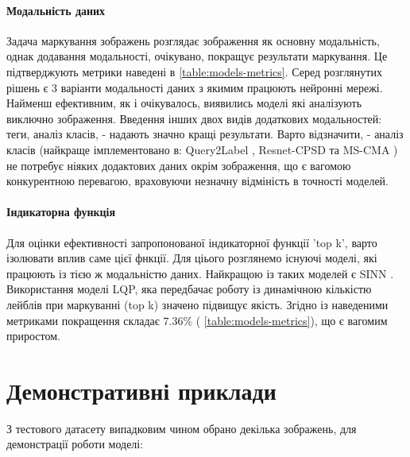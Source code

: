 \documentclass{udstu}
\begin{document}
\paragraph{\textbf{Модальність даних}}
Задача маркування зображень розглядає зображення як основну модальність, однак додавання модальності,
очікувано, покращує результати маркування. Це підтверджують метрики наведені в \tablename{ \ref{table:models-metrics}}.
Серед розглянутих рішень є 3 варіанти модальності даних з якимим працюють нейронні мережі.
Найменш ефективним, як і очікувалось, виявились моделі які аналізують виключно зображення.
Введення інших двох видів додаткових модальностей: теги, аналіз класів, - надають значно кращі результати.
Варто відзначити, - аналіз класів (найкраще імплементовано в: Query2Label \cite{q2l}, Resnet-CPSD
\cite{cpsd} та MS-CMA \cite{cma}) не потребує ніяких додактових даних окрім зображення,
що є вагомою конкурентною перевагою, враховуючи незначну відміність в точності моделей.

\paragraph{\textbf{Індикаторна функція}}
Для оцінки ефективності запропонованої індикаторної функції 'top k', варто ізолювати вплив саме цієї фнкції.
Для ціього розглянемо існуючі моделі, які працюють із тією ж модальністю даних. Найкращою із таких моделей є
SINN \cite{cnn-sinn}. Використання моделі LQP, яка передбачає роботу із динамічною кількістю лейблів при маркуванні
(top k) значено підвищує якість. Згідно із наведеними метриками покращення складає
$7.36\%$ (\tablename{ \ref{table:models-metrics}}), що є вагомим приростом.


\clearpage

\section{Демонстративні приклади}

З тестового датасету випадковим чином обрано декілька зображень, для демонстрації роботи моделі:
\end{document}
